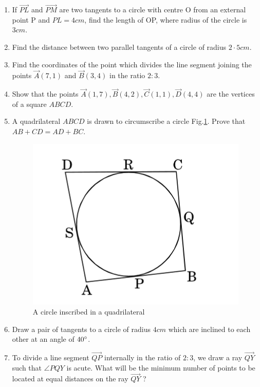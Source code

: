 \documentclass{article}
\begin{document}
\begin{enumerate}
\item If $ \vec{PL} $ and $ \vec{PM} $ are two tangents to a circle with centre O from an external point P and $PL = 4 cm$, find the length of OP, where radius of the circle is $3 cm$.
			
\item Find the distance between two parallel tangents of a circle of radius $2·5 cm$. 

\item Find the coordinates of the point which divides the line segment joining the points $\vec{A}(7, 1)$ and $\vec{B}( 3, 4)$ in the ratio $2 : 3$. 

\item Show that the points $\vec{A}(1,7), \vec{B}(4,2), \vec{C}(1,1), \vec{D}(4,4)$ are the vertices of a square $ABCD$. 

\item A quadrilateral $ABCD$ is drawn to circumscribe a circle Fig.\ref{fig:2}. Prove that $ AB + CD = AD + BC. $
	\begin{figure}[h]
	\centering
	\includegraphics[width=\columnwidth]{figs/2.jpg}
	\caption{A circle inscribed in a quadrilateral}
	\label{fig:2}
	\end{figure}

\item Draw a pair of tangents to a circle of radius $4 cm$ which are inclined to each other at an angle of $40\degree$. 

\item To divide a line segment $\vec{QP}$ internally in the ratio of $2 : 3$, we draw a ray $\vec{QY}$ such that $\angle PQY$ is acute. What will be the minimum number of points to be located at equal distances on the ray $\vec{QY}$ ? 


\end{enumerate}
\end{document}
